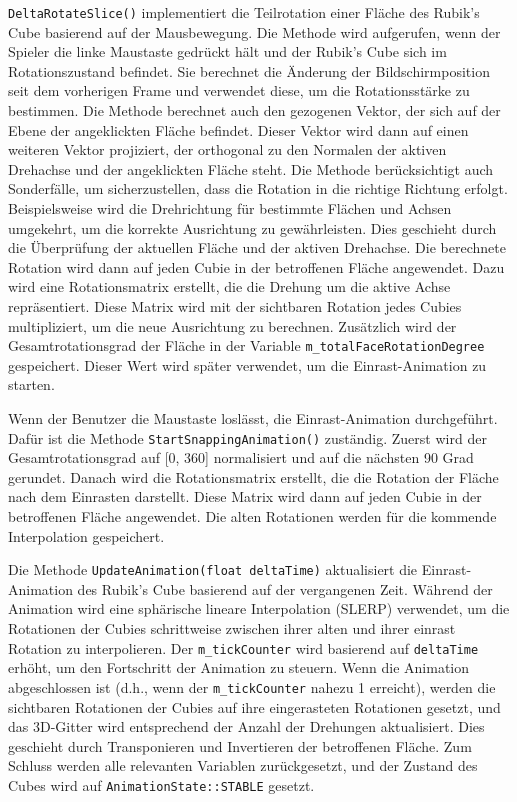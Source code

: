 \texttt{DeltaRotateSlice()} implementiert die Teilrotation einer Fläche des Rubik's Cube basierend auf der Mausbewegung. Die Methode wird aufgerufen, wenn der Spieler die linke Maustaste gedrückt hält und der Rubik's Cube sich im Rotationszustand befindet. Sie berechnet die Änderung der Bildschirmposition seit dem vorherigen Frame und verwendet diese, um die Rotationsstärke zu bestimmen.
Die Methode berechnet auch den gezogenen Vektor, der sich auf der Ebene der angeklickten Fläche befindet. Dieser Vektor wird dann auf einen weiteren Vektor projiziert, der orthogonal zu den Normalen der aktiven Drehachse und der angeklickten Fläche steht.
Die Methode berücksichtigt auch Sonderfälle, um sicherzustellen, dass die Rotation in die richtige Richtung erfolgt. Beispielsweise wird die Drehrichtung für bestimmte Flächen und Achsen umgekehrt, um die korrekte Ausrichtung zu gewährleisten. Dies geschieht durch die Überprüfung der aktuellen Fläche und der aktiven Drehachse.
Die berechnete Rotation wird dann auf jeden Cubie in der betroffenen Fläche angewendet. Dazu wird eine Rotationsmatrix erstellt, die die Drehung um die aktive Achse repräsentiert. Diese Matrix wird mit der sichtbaren Rotation jedes Cubies multipliziert, um die neue Ausrichtung zu berechnen.
Zusätzlich wird der Gesamtrotationsgrad der Fläche in der Variable \texttt{m\_totalFaceRotationDegree} gespeichert. Dieser Wert wird später verwendet, um die Einrast-Animation zu starten.

Wenn der Benutzer die Maustaste loslässt, die Einrast-Animation durchgeführt. Dafür ist die Methode \texttt{StartSnappingAnimation()} zuständig. Zuerst wird der Gesamtrotationsgrad auf [0, 360] normalisiert und auf die nächsten 90 Grad gerundet. Danach wird die Rotationsmatrix erstellt, die die Rotation der Fläche nach dem Einrasten darstellt. Diese Matrix wird dann auf jeden Cubie in der betroffenen Fläche angewendet. Die alten Rotationen werden für die kommende Interpolation gespeichert.

Die Methode \texttt{UpdateAnimation(float deltaTime)} aktualisiert die Einrast-Ani\-mation des Rubik's Cube basierend auf der vergangenen Zeit. 
Während der Animation wird eine sphärische lineare Interpolation (SLERP) verwendet, um die Rotationen der Cubies schrittweise zwischen ihrer alten und ihrer einrast Rotation zu interpolieren. Der \texttt{m\_tickCounter} wird basierend auf \texttt{deltaTime} erhöht, um den Fortschritt der Animation zu steuern. 
Wenn die Animation abgeschlossen ist (d.h., wenn der \texttt{m\_tickCounter} nahezu 1 erreicht), werden die sichtbaren Rotationen der Cubies auf ihre eingerasteten Rotationen gesetzt, und das 3D-Gitter wird entsprechend der Anzahl der Drehungen aktualisiert. Dies geschieht durch Transponieren und Invertieren der betroffenen Fläche.
Zum Schluss werden alle relevanten Variablen zurückgesetzt, und der Zustand des Cubes wird auf \texttt{AnimationState::STABLE} gesetzt.

